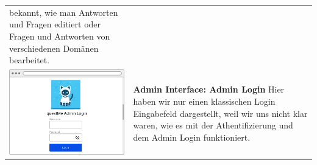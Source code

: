 \begin{tabular}{C{6cm}  L{7cm}}
    bekannt, wie man Antworten und Fragen editiert oder Fragen und Antworten von verschiedenen Domänen bearbeitet. \\
    \includegraphics[width=\linewidth]{bilder/old vers. UI Design/Admin Interface.png} & \textbf{Admin Interface: Admin Login} \newline 
    Hier haben wir nur einen klassischen Login Eingabefeld dargestellt, weil wir uns nicht klar waren, wie es mit der Athentifizierung und dem Admin
    Login funktioniert.
\end{tabular}